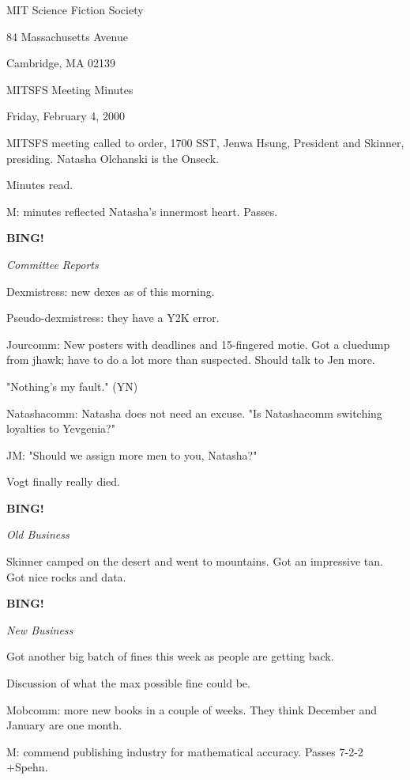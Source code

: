 \documentclass[12pt]{article}
\newcommand{\bing}{{\bf BING!} }
\newcommand{\goto}[1]{\bing \vskip 12pt \centerline{{\em{#1}}}}
\begin{document}
\begin{center}

MIT Science Fiction Society 

84 Massachusetts Avenue

Cambridge, MA 02139

\vspace{12pt}

MITSFS Meeting Minutes 

Friday, February 4, 2000

\end{center}
 
\vspace{18pt}

\setlength{\parskip}{6pt}

\noindent
MITSFS meeting called to order, 1700 SST, Jenwa Hsung, President and
Skinner, presiding.  Natasha Olchanski is the Onseck.

Minutes read.

M: minutes reflected Natasha's innermost heart. Passes.

\goto{Committee Reports}

Dexmistress: new dexes as of this morning.

Pseudo-dexmistress: they have a Y2K error.

Jourcomm: New posters with deadlines and 15-fingered motie. Got a cluedump from jhawk; have to do a lot more than suspected. Should talk to Jen more.

"Nothing's my fault." (YN)

Natashacomm: Natasha does not need an excuse. "Is Natashacomm switching loyalties to Yevgenia?"

JM: "Should we assign more men to you, Natasha?"

Vogt finally really died.

\goto{Old Business}

Skinner camped on the desert and went to mountains. Got an impressive tan. Got nice rocks and data.

\goto{New Business}

Got another big batch of fines this week as people are getting back.

Discussion of what the max possible fine could be.

Mobcomm: more new books in a couple of weeks. They think December and January are one month.

M: commend publishing industry for mathematical accuracy. Passes 7-2-2 +Spehn.
\end{document}
